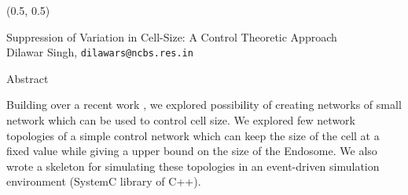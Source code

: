 \documentclass{beamer}
\begin{document}
\begin{textblock}{15}(0.5, 0.5)
    \begin{block}{}
        \centering
        \Large Suppression of Variation in Cell-Size: A Control Theoretic Approach \\
        \large Dilawar Singh, \texttt{dilawars@ncbs.res.in}
    \end{block}
    \begin{block}{Abstract}

        Building over a recent work \cite{paulsson}, we explored possibility of
        creating networks of small network which can be used to control cell
        size. We explored few network topologies of a simple control network
        which can keep the size of the cell at a fixed value while giving a
        upper bound on the size of the Endosome. We also wrote a skeleton for
        simulating these topologies in an event-driven simulation environment
        (SystemC library of C++).

\end{block}
\end{textblock}
\end{document}
